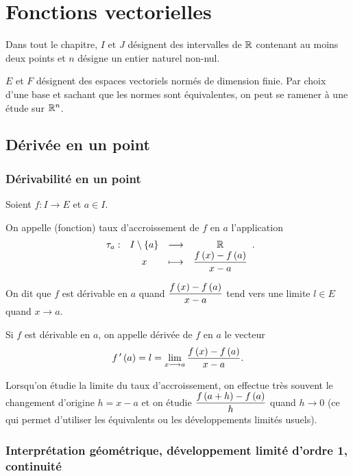 \chapter{Fonctions vectorielles}

\minitoc

Dans tout le chapitre, \(I\) et \(J\) désignent des intervalles de \(\mathbb{R}\) contenant au moins deux points et \(n\) désigne un entier naturel non-nul.

\(E\) et \(F\) désignent des espaces vectoriels normés de dimension finie. Par choix d'une base et sachant que les normes sont équivalentes, on peut se ramener à une étude sur \(\mathbb{R}^n\).

\section{Dérivée en un point}

\subsection{Dérivabilité en un point}

\begin{defi}
Soient \(f:I\to E\) et \(a\in I\).

On appelle (fonction) taux d'accroissement de \(f\) en \(a\) l'application \[\begin{array}[t]{cccc}\tau_a : & I\setminus\left\lbrace a\right\rbrace & \longrightarrow & \mathbb{R} \\ & x & \longmapsto & \dfrac{f\left(x\right)-f\left(a\right)}{x-a}\end{array}.\]

On dit que \(f\) est dérivable en \(a\) quand \(\dfrac{f\left(x\right)-f\left(a\right)}{x-a}\) tend vers une limite \(l\in E\) quand \(x\to a\).

Si \(f\) est dérivable en \(a\), on appelle dérivée de \(f\) en \(a\) le vecteur \[f^{\,\prime}\left(a\right)=l=\lim_{x\longrightarrow a}\dfrac{f\left(x\right)-f\left(a\right)}{x-a}.\]
\end{defi}

\begin{rem}
Lorsqu'on étudie  la limite du taux d'accroissement, on effectue très souvent le changement d'origine \(h=x-a\) et on étudie \(\dfrac{f\left(a+h\right)-f\left(a\right)}{h}\) quand \(h\to0\) (ce qui permet d'utiliser les équivalents ou les développements limités usuels).
\end{rem}

\subsection{Interprétation géométrique, développement limité d'ordre 1, continuité}

